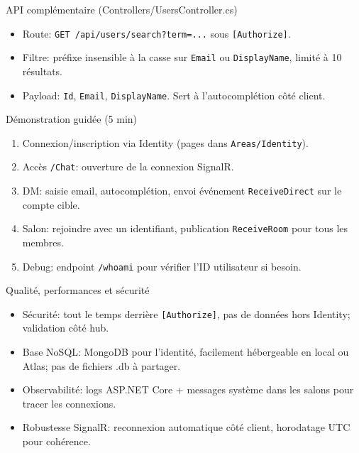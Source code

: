 \documentclass[10pt]{beamer}
\begin{document}
\begin{frame}{API complémentaire (Controllers/UsersController.cs)}
  \begin{itemize}
    \item Route: \texttt{GET /api/users/search?term=...} sous \texttt{[Authorize]}.
    \item Filtre: préfixe insensible à la casse sur \texttt{Email} ou \texttt{DisplayName}, limité à 10 résultats.
    \item Payload: \texttt{Id}, \texttt{Email}, \texttt{DisplayName}. Sert à l'autocomplétion côté client.
  \end{itemize}
\end{frame}

\begin{frame}{Démonstration guidée (5 min)}
  \begin{enumerate}
    \item Connexion/inscription via Identity (pages dans \texttt{Areas/Identity}).
    \item Accès \texttt{/Chat}: ouverture de la connexion SignalR.
    \item DM: saisie email, autocomplétion, envoi \Rightarrow événement \texttt{ReceiveDirect} sur le compte cible.
    \item Salon: rejoindre avec un identifiant, publication \Rightarrow \texttt{ReceiveRoom} pour tous les membres.
    \item Debug: endpoint \texttt{/whoami} pour vérifier l'ID utilisateur si besoin.
  \end{enumerate}
\end{frame}

\begin{frame}{Qualité, performances et sécurité}
  \begin{itemize}
    \item Sécurité: tout le temps derrière \texttt{[Authorize]}, pas de données hors Identity; validation côté hub.
    \item Base NoSQL: MongoDB pour l'identité, facilement hébergeable en local ou Atlas; pas de fichiers .db à partager.
    \item Observabilité: logs ASP.NET Core + messages système dans les salons pour tracer les connexions.
    \item Robustesse SignalR: reconnexion automatique côté client, horodatage UTC pour cohérence.
  \end{itemize}
\end{frame}
\end{document}

